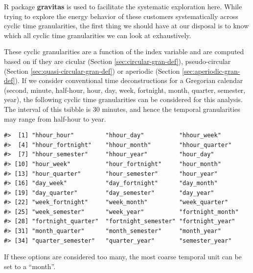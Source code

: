 \documentclass[12pt]{article}
\newenvironment{Shaded}{\begin{snugshade}}{\end{snugshade}}
\newcommand{\DataTypeTok}[1]{\textcolor[rgb]{0.13,0.29,0.53}{#1}}
\newcommand{\KeywordTok}[1]{\textcolor[rgb]{0.13,0.29,0.53}{\textbf{#1}}}
\newcommand{\NormalTok}[1]{#1}
\newcommand{\OperatorTok}[1]{\textcolor[rgb]{0.81,0.36,0.00}{\textbf{#1}}}
\newcommand{\StringTok}[1]{\textcolor[rgb]{0.31,0.60,0.02}{#1}}
\begin{document}
R package \textbf{gravitas} \citep{R-gravitas} is used to facilitate the systematic exploration here. While trying to explore the energy behavior of these customers systematically across cyclic time granularities, the first thing we should have at our disposal is to know which all cyclic time granularities we can look at exhaustively.

These cyclic granularities are a function of the index variable and are computed based on if they are cicular (Section \ref{sec:circular-gran-def}), pseudo-circular (Section \ref{sec:quasi-circular-gran-def}) or aperiodic (Section \ref{sec:aperiodic-gran-def}). If we consider conventional time deconstructions for a Gregorian calendar (second, minute, half-hour, hour, day, week, fortnight, month, quarter, semester, year), the following cyclic time granularities can be considered for this analysis. The interval of this tsibble is 30 minutes, and hence the temporal granularities may range from half-hour to year.

\begin{Shaded}
\end{Shaded}

\begin{verbatim}
#>  [1] "hhour_hour"         "hhour_day"          "hhour_week"        
#>  [4] "hhour_fortnight"    "hhour_month"        "hhour_quarter"     
#>  [7] "hhour_semester"     "hhour_year"         "hour_day"          
#> [10] "hour_week"          "hour_fortnight"     "hour_month"        
#> [13] "hour_quarter"       "hour_semester"      "hour_year"         
#> [16] "day_week"           "day_fortnight"      "day_month"         
#> [19] "day_quarter"        "day_semester"       "day_year"          
#> [22] "week_fortnight"     "week_month"         "week_quarter"      
#> [25] "week_semester"      "week_year"          "fortnight_month"   
#> [28] "fortnight_quarter"  "fortnight_semester" "fortnight_year"    
#> [31] "month_quarter"      "month_semester"     "month_year"        
#> [34] "quarter_semester"   "quarter_year"       "semester_year"
\end{verbatim}

If these options are considered too many, the most coarse temporal unit can be set to a ``month''.

\begin{Shaded}
\end{Shaded}
\end{document}

